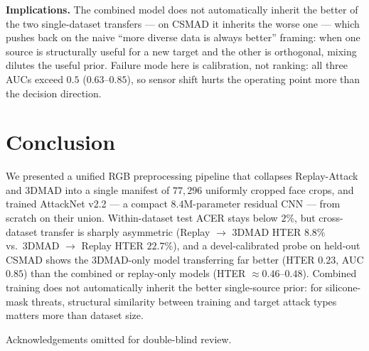 \documentclass[anonymous, manuscript, screen, review]{acmart}
\begin{document}
\textbf{Implications.} The combined model does not automatically
inherit the better of the two single-dataset transfers --- on CSMAD it
inherits the worse one --- which pushes back on the naive ``more
diverse data is always better'' framing: when one source is structurally
useful for a new target and the other is orthogonal, mixing dilutes the
useful prior. Failure mode here is calibration, not ranking: all three
AUCs exceed $0{.}5$ ($0{.}63$--$0{.}85$), so sensor shift hurts the
operating point more than the decision direction.

\section{Conclusion}
\label{sec:conclusion}

We presented a unified RGB preprocessing pipeline that collapses
Replay-Attack and 3DMAD into a single manifest of $77{,}296$ uniformly
cropped face crops, and trained AttackNet v2.2 --- a compact
$8{.}4$M-parameter residual CNN --- from scratch on their union.
Within-dataset test ACER stays below $2\%$, but cross-dataset transfer
is sharply asymmetric (Replay $\rightarrow$ 3DMAD HTER $8{.}8\%$ vs.\
3DMAD $\rightarrow$ Replay HTER $22{.}7\%$), and a devel-calibrated
probe on held-out CSMAD shows the 3DMAD-only model transferring far
better (HTER $0{.}23$, AUC $0{.}85$) than the combined or replay-only
models (HTER $\approx 0{.}46$--$0{.}48$). Combined training does not
automatically inherit the better single-source prior: for
silicone-mask threats, structural similarity between training and
target attack types matters more than dataset size.

\begin{acks}
Acknowledgements omitted for double-blind review.
\end{acks}
\end{document}
